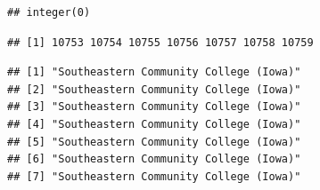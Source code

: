 \documentclass[
]{article}
\newenvironment{Shaded}{\begin{snugshade}}{\end{snugshade}}
\newcommand{\DecValTok}[1]{\textcolor[rgb]{0.00,0.00,0.81}{#1}}
\newcommand{\KeywordTok}[1]{\textcolor[rgb]{0.13,0.29,0.53}{\textbf{#1}}}
\newcommand{\NormalTok}[1]{#1}
\newcommand{\OperatorTok}[1]{\textcolor[rgb]{0.81,0.36,0.00}{\textbf{#1}}}
\newcommand{\StringTok}[1]{\textcolor[rgb]{0.31,0.60,0.02}{#1}}
\begin{document}
\begin{verbatim}
## integer(0)
\end{verbatim}

\begin{Shaded}
\end{Shaded}

\begin{Shaded}
\end{Shaded}

\begin{verbatim}
## [1] 10753 10754 10755 10756 10757 10758 10759
\end{verbatim}

\begin{Shaded}
\end{Shaded}

\begin{verbatim}
## [1] "Southeastern Community College (Iowa)"
## [2] "Southeastern Community College (Iowa)"
## [3] "Southeastern Community College (Iowa)"
## [4] "Southeastern Community College (Iowa)"
## [5] "Southeastern Community College (Iowa)"
## [6] "Southeastern Community College (Iowa)"
## [7] "Southeastern Community College (Iowa)"
\end{verbatim}

\begin{Shaded}
\end{Shaded}
\end{document}
